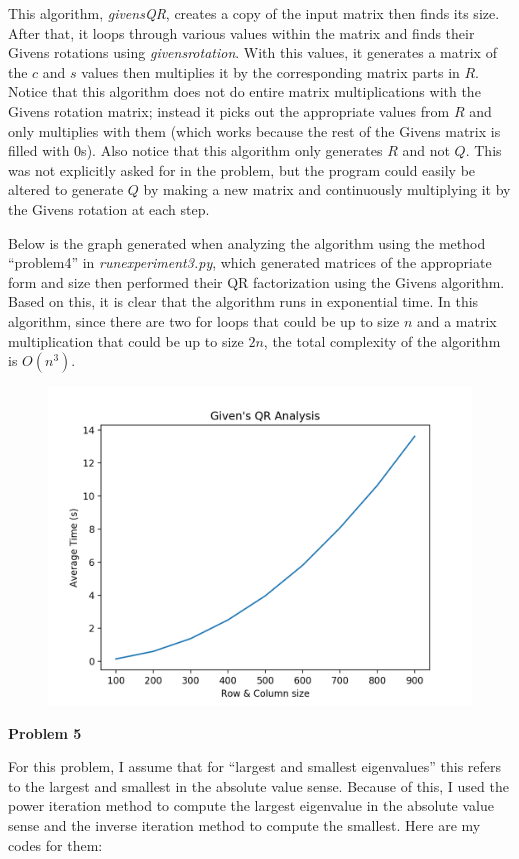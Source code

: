 \documentclass{article}
\newcommand{\Problem}[1]{\textbf{\large Problem #1}}
\begin{document}
This algorithm, \textit{givensQR}, creates a copy of the input matrix then finds its size.
After that, it loops through various values within the matrix and finds their Givens rotations using \textit{givensrotation}.
With this values, it generates a matrix of the $c$ and $s$ values then multiplies it by the corresponding matrix parts in $R$. 
Notice that this algorithm does not do entire matrix multiplications with the Givens rotation matrix; instead it picks out the appropriate values from $R$ and only multiplies with them (which works because the rest of the Givens matrix is filled with 0s). 
Also notice that this algorithm only generates $R$ and not $Q$.
This was not explicitly asked for in the problem, but the program could easily be altered to generate $Q$ by making a new matrix and continuously multiplying it by the Givens rotation at each step. 

Below is the graph generated when analyzing the algorithm using the method ``problem4'' in \textit{runexperiment3.py}, which generated matrices of the appropriate form and size then performed their QR factorization using the Givens algorithm. 
Based on this, it is clear that the algorithm runs in exponential time. 
In this algorithm, since there are two for loops that could be up to size $n$ and a matrix multiplication that could be up to size $2n$, the total complexity of the algorithm is $O(n^3)$.  

\begin{figure}[H]
\centering
\includegraphics[width=12cm]{givensresult}	
\end{figure}

\Problem{5}

For this problem, I assume that for ``largest and smallest eigenvalues'' this refers to the largest and smallest in the absolute value sense. 
Because of this, I used the power iteration method to compute the largest eigenvalue in the absolute value sense and the inverse iteration method to compute the smallest. 
Here are my codes for them:
\end{document}
